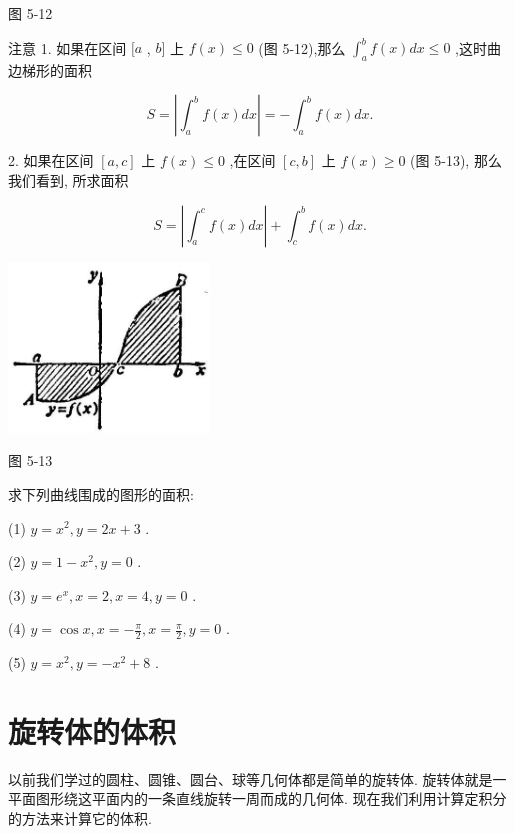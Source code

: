 \documentclass[lang=cn,newtx,12pt,scheme=chinese]{elegantbook}
\begin{document}
图 5-12

注意 1. 如果在区间 \(\lbrack a\) , \(b\rbrack\) 上 \(f\left( x\right) \leq 0\) (图 5-12),那么 \({\int }_{a}^{b}f\left( x\right) {dx} \leq 0\) ,这时曲边梯形的面积

\[
S = \left| {{\int }_{a}^{b}f\left( x\right) {dx}}\right| = - {\int }_{a}^{b}f\left( x\right) {dx}.
\]

2. 如果在区间 \(\left\lbrack {a,c}\right\rbrack\) 上 \(f\left( x\right) \leq 0\) ,在区间 \(\left\lbrack {c,b}\right\rbrack\) 上 \(f\left( x\right) \geq 0\) (图 5-13), 那么我们看到, 所求面积

\[
S = \left| {{\int }_{a}^{c}f\left( x\right) {dx}}\right| + {\int }_{c}^{b}f\left( x\right) {dx}.
\]

\begin{center}
\includegraphics[max width=0.4\textwidth]{images/01912c18-5c3f-733d-b775-749ba9897a9d_235_691141.jpg}
\end{center}

图 5-13

\begin{problemset}[练习]

\item 求下列曲线围成的图形的面积:

(1) \(y = {x}^{2},y = {2x} + 3\) .

(2) \(y = 1 - {x}^{2},y = 0\) .

(3) \(y = {e}^{x},x = 2,x = 4,y = 0\) .

(4) \(y = \cos x,x = - \frac{\pi }{2},x = \frac{\pi }{2},y = 0\) .

(5) \(y = {x}^{2},y = - {x}^{2} + 8\) .

\end{problemset}

\section{旋转体的体积}

以前我们学过的圆柱、圆锥、圆台、球等几何体都是简单的旋转体. 旋转体就是一平面图形绕这平面内的一条直线旋转一周而成的几何体. 现在我们利用计算定积分的方法来计算它的体积.
\end{document}
